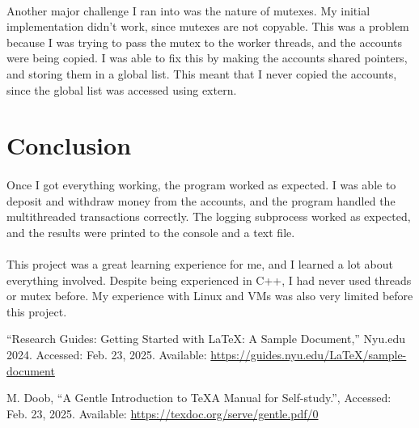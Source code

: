 \documentclass[12pt]{article}
\begin{document}
\paragraph{}
Another major challenge I ran into was the nature of mutexes.
My initial implementation didn't work, since mutexes are not copyable.
This was a problem because I was trying to pass the mutex to the worker threads, and the accounts were being copied.
I was able to fix this by making the accounts shared pointers, and storing them in a global list.
This meant that I never copied the accounts, since the global list was accessed using extern.

\section{Conclusion}

\paragraph{}
Once I got everything working, the program worked as expected.
I was able to deposit and withdraw money from the accounts, and the program handled the multithreaded transactions correctly.
The logging subprocess worked as expected, and the results were printed to the console and a text file.

\paragraph{}
This project was a great learning experience for me, and I learned a lot about everything involved.
Despite being experienced in C++, I had never used threads or mutex before.
My experience with Linux and VMs was also very limited before this project.

\begin{thebibliography}{1}

    ``Research Guides: Getting Started with LaTeX: A Sample Document,''
    Nyu.edu 2024.
    Accessed: Feb. 23, 2025.
    Available: \url{https://guides.nyu.edu/LaTeX/sample-document}

    M. Doob, 
    “A Gentle Introduction to \TeX A Manual for Self-study.”,
    Accessed: Feb. 23, 2025. 
    Available: \url{https://texdoc.org/serve/gentle.pdf/0}



\end{thebibliography}
\end{document}
